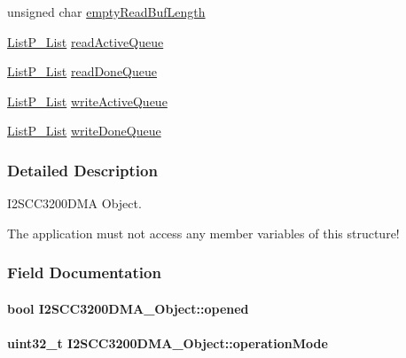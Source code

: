 \begin{DoxyCompactItemize}
\item 
unsigned char \hyperlink{struct_i2_s_c_c3200_d_m_a___object_ade1e064516f5b2545ea0cb49026bb909}{empty\+Read\+Buf\+Length}
\item 
\hyperlink{struct_list_p___list}{List\+P\+\_\+\+List} \hyperlink{struct_i2_s_c_c3200_d_m_a___object_a6be83ce23bfa319c21b4f683872f3f40}{read\+Active\+Queue}
\item 
\hyperlink{struct_list_p___list}{List\+P\+\_\+\+List} \hyperlink{struct_i2_s_c_c3200_d_m_a___object_a319c93aed9666750317a234244b32d39}{read\+Done\+Queue}
\item 
\hyperlink{struct_list_p___list}{List\+P\+\_\+\+List} \hyperlink{struct_i2_s_c_c3200_d_m_a___object_a82ca68cd962045ee65cfdc412e9e75cd}{write\+Active\+Queue}
\item 
\hyperlink{struct_list_p___list}{List\+P\+\_\+\+List} \hyperlink{struct_i2_s_c_c3200_d_m_a___object_a13ac8bba9aa2e279efbf520be0ec9fab}{write\+Done\+Queue}
\end{DoxyCompactItemize}


\subsubsection{Detailed Description}
I2\+S\+C\+C3200\+D\+M\+A Object. 

The application must not access any member variables of this structure! 

\subsubsection{Field Documentation}
\paragraph[{opened}]{\setlength{\rightskip}{0pt plus 5cm}bool I2\+S\+C\+C3200\+D\+M\+A\+\_\+\+Object\+::opened}\label{struct_i2_s_c_c3200_d_m_a___object_a6026739b85a6fc1025a928341306be66}
\paragraph[{operation\+Mode}]{\setlength{\rightskip}{0pt plus 5cm}uint32\+\_\+t I2\+S\+C\+C3200\+D\+M\+A\+\_\+\+Object\+::operation\+Mode}\label{struct_i2_s_c_c3200_d_m_a___object_a075dffee83187f507dcdd18e5ac9fceb}
